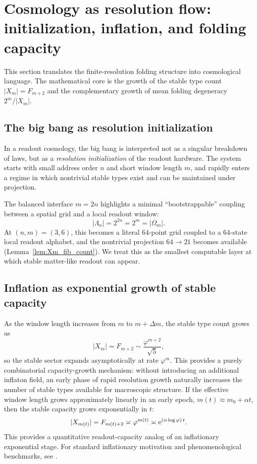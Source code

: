 
\section{Cosmology as resolution flow: initialization, inflation, and folding capacity}
\label{sec:cosmology_resolution_flow}

This section translates the finite-resolution folding structure into cosmological language.
The mathematical core is the growth of the stable type count $|X_m|=F_{m+2}$ and the complementary growth of mean folding degeneracy $2^m/|X_m|$.

\subsection{The big bang as resolution initialization}
\label{subsec:big_bang_init}

In a readout cosmology, the big bang is interpreted not as a singular breakdown of laws, but as a \emph{resolution initialization} of the readout hardware.
The system starts with small address order $n$ and short window length $m$, and rapidly enters a regime in which nontrivial stable types exist and can be maintained under projection.

The balanced interface $m=2n$ highlights a minimal ``bootstrappable'' coupling between a spatial grid and a local readout window:
\[
|\Lambda_n|=2^{2n}=2^m=|\Omega_m|.
\]
At $(n,m)=(3,6)$, this becomes a literal $64$-point grid coupled to a $64$-state local readout alphabet, and the nontrivial projection $64\to 21$ becomes available (Lemma~\ref{lem:Xm_fib_count}).
We treat this as the smallest computable layer at which stable matter-like readout can appear.

\subsection{Inflation as exponential growth of stable capacity}
\label{subsec:inflation_capacity}

As the window length increases from $m$ to $m+\Delta m$, the stable type count grows as
\[
|X_m|=F_{m+2}\sim \frac{\varphi^{m+2}}{\sqrt{5}},
\]
so the stable sector expands asymptotically at rate $\varphi^m$.
This provides a purely combinatorial capacity-growth mechanism: without introducing an additional inflaton field, an early phase of rapid resolution growth naturally increases the number of stable types available for macroscopic structure.
If the effective window length grows approximately linearly in an early epoch, $m(t)\approx m_0+\alpha t$, then the stable capacity grows exponentially in $t$:
\[
|X_{m(t)}|=F_{m(t)+2}\asymp \varphi^{m(t)}\asymp \mathrm{e}^{(\alpha\log\varphi)\,t}.
\]
This provides a quantitative readout-capacity analog of an inflationary exponential stage.
For standard inflationary motivation and phenomenological benchmarks, see \cite{Guth1981}.


